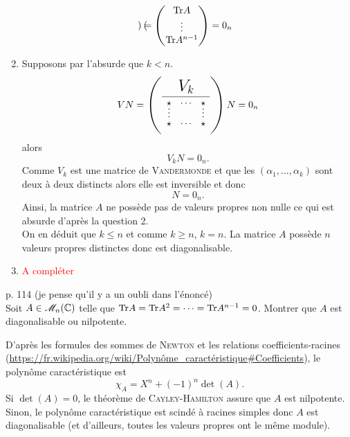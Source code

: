 \begin{solution}
\begin{enumerate}
\begin{align*}
\begin{pmatrix}
            \end{pmatrix}
            = 
            \begin{pmatrix}
                \mathrm{Tr}{A} \\ \vdots \\ \mathrm{Tr}{A^{n-1}}
            \end{pmatrix}
            =
            0_n
        \end{align*}
        \item Supposons par l'absurde que $k < n$. \\
        $$V N = \vandermondepartiel N = 0_n$$
        alors 
        $$V_k N = 0_n.$$
        Comme $V_k$ est une matrice de \textsc{Vandermonde} et que les $(\alpha_1, \dots, \alpha_k)$ sont deux à deux distincts alors elle est inversible et donc
        $$N = 0_n.$$
        Ainsi, la matrice $A$ ne possède pas de valeurs propres non nulle ce qui est absurde d'après la question 2. \\
        On en déduit que $k \leqslant n$ et comme $k \geqslant n$, $k=n$. La matrice $A$ possède $n$ valeurs propres distinctes donc est diagonalisable.
        \item \textcolor{red}{A compléter}
        \end{enumerate}
\end{solution}

\begin{exercice}
    \cite{reduc_des_endo} p. 114 (je pense qu'il y a un oubli dans l'énoncé)\\
    Soit $A \in \mathscr{M}_n(\mathbb{C})$ telle que $\mathrm{Tr}{A} = \mathrm{Tr}{A^2} = \cdots = \mathrm{Tr}{A^{n-1}} = 0$. Montrer que $A$ est diagonalisable ou nilpotente. 
\end{exercice}

\begin{elem_sol}
    D'après les formules des sommes de \textsc{Newton} et les relations coefficients-racines (\url{https://fr.wikipedia.org/wiki/Polynôme_caractéristique#Coefficients}), le polynôme caractéristique est 
    $$\chi_A = X^n + (-1)^n \det(A).$$
    Si $\det(A) = 0$, le théorème de \textsc{Cayley}-\textsc{Hamilton} assure que $A$ est nilpotente. Sinon, le polynôme caractéristique est scindé à racines simples donc $A$ est diagonalisable (et d'ailleurs, toutes les valeurs propres ont le même module).
\end{elem_sol}